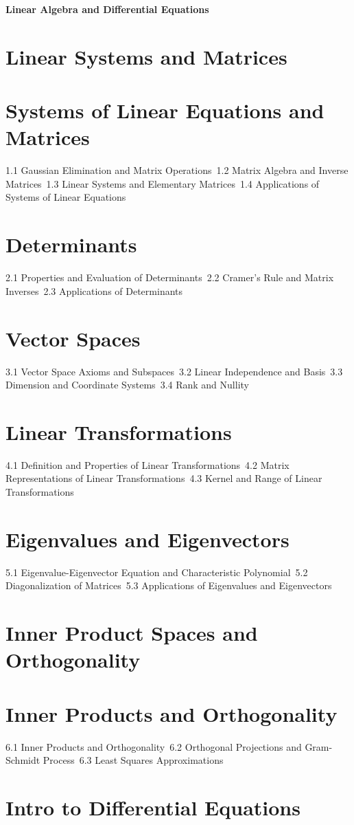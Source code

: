 {\LARGE \bf{Linear Algebra and Differential Equations}}
\section{Linear Systems and Matrices}
\section{Systems of Linear Equations and Matrices}
1.1 Gaussian Elimination and Matrix Operations\
1.2 Matrix Algebra and Inverse Matrices\
1.3 Linear Systems and Elementary Matrices\
1.4 Applications of Systems of Linear Equations\
\section{Determinants}
2.1 Properties and Evaluation of Determinants\
2.2 Cramer's Rule and Matrix Inverses\
2.3 Applications of Determinants\
\section{Vector Spaces}
3.1 Vector Space Axioms and Subspaces\
3.2 Linear Independence and Basis\
3.3 Dimension and Coordinate Systems\
3.4 Rank and Nullity\
\section{Linear Transformations}
4.1 Definition and Properties of Linear Transformations\
4.2 Matrix Representations of Linear Transformations\
4.3 Kernel and Range of Linear Transformations\
\section{Eigenvalues and Eigenvectors}
5.1 Eigenvalue-Eigenvector Equation and Characteristic Polynomial\
5.2 Diagonalization of Matrices\
5.3 Applications of Eigenvalues and Eigenvectors\
\section{Inner Product Spaces and Orthogonality}
\section{Inner Products and Orthogonality}
6.1 Inner Products and Orthogonality\
6.2 Orthogonal Projections and Gram-Schmidt Process\
6.3 Least Squares Approximations\
\section{Intro to Differential Equations}
